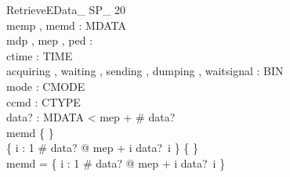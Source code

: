 \begin{schema}{RetrieveEData\_ SP\_ 20}\\
memp , memd : \seq MDATA \\
mdp , mep , ped : \nat \\
ctime : TIME \\
acquiring , waiting , sending , dumping , waitsignal : BIN \\
mode : CMODE \\
ccmd : CTYPE \\
data? : \seq MDATA 
 < mep + \# data? \\
memd \neq \{ \} \\
\{ i : 1 \upto \# data? @ mep + i \mapsto data?~i \} \neq \{ \} \\
\dom memd = \dom \{ i : 1 \upto \# data? @ mep + i \mapsto data?~i \}
\end{schema}
